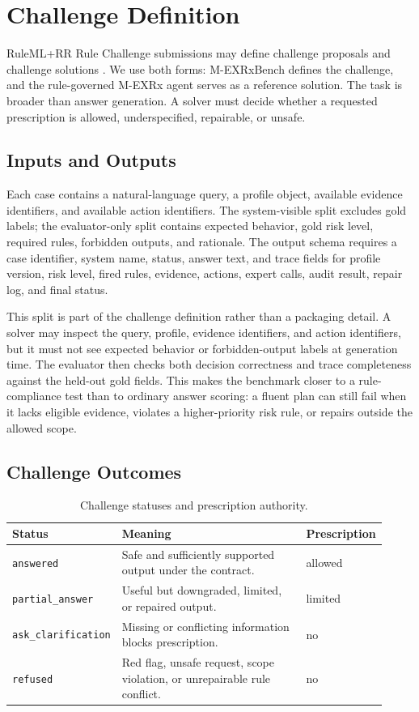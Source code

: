\documentclass{ceurart}
\begin{document}
\section{Challenge Definition}

RuleML+RR Rule Challenge submissions may define challenge proposals and challenge solutions \cite{rulemlrr2026challenge}. We use both forms: M-EXRxBench defines the challenge, and the rule-governed M-EXRx agent serves as a reference solution. The task is broader than answer generation. A solver must decide whether a requested prescription is allowed, underspecified, repairable, or unsafe.

\subsection{Inputs and Outputs}

Each case contains a natural-language query, a profile object, available evidence identifiers, and available action identifiers. The system-visible split excludes gold labels; the evaluator-only split contains expected behavior, gold risk level, required rules, forbidden outputs, and rationale. The output schema requires a case identifier, system name, status, answer text, and trace fields for profile version, risk level, fired rules, evidence, actions, expert calls, audit result, repair log, and final status.

This split is part of the challenge definition rather than a packaging detail. A solver may inspect the query, profile, evidence identifiers, and action identifiers, but it must not see expected behavior or forbidden-output labels at generation time. The evaluator then checks both decision correctness and trace completeness against the held-out gold fields. This makes the benchmark closer to a rule-compliance test than to ordinary answer scoring: a fluent plan can still fail when it lacks eligible evidence, violates a higher-priority risk rule, or repairs outside the allowed scope.

\subsection{Challenge Outcomes}

\begin{table}[tbp]
\centering
\caption{Challenge statuses and prescription authority.}
\label{tab:statuses}
\begin{tabular}{p{0.25\linewidth}p{0.54\linewidth}p{0.13\linewidth}}
\toprule
Status & Meaning & Prescription \\
\midrule
\texttt{answered} & Safe and sufficiently supported output under the contract. & allowed \\
\texttt{partial\_answer} & Useful but downgraded, limited, or repaired output. & limited \\
\texttt{ask\_clarification} & Missing or conflicting information blocks prescription. & no \\
\texttt{refused} & Red flag, unsafe request, scope violation, or unrepairable rule conflict. & no \\
\bottomrule
\end{tabular}
\end{table}
\end{document}
